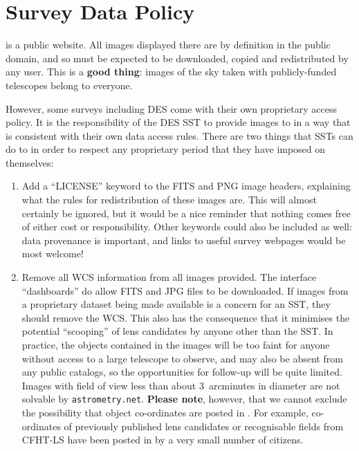\documentclass[a4paper,twocolumn]{article}
\begin{document}


\section{Survey Data Policy}
\label{sec:data}

\SW is a public website. All images displayed there are by definition in the
public domain, and so must be expected to be downloaded, copied and
redistributed by any \SW user. This is a \textbf{good thing}: images of the sky taken
with publicly-funded telescopes belong to everyone. 

However, some surveys including DES come with their own proprietary access policy. It is the responsibility
of the DES SST to provide images to \SW in a way that is consistent
with their own data access rules. There are two things that SSTs can
do to in order to respect any proprietary period that they have imposed on
themselves:
\begin{enumerate}

\item Add a ``LICENSE'' keyword to the FITS and PNG image headers, explaining
what the rules for redistribution of these images are. This will almost
certainly be ignored, but it would be a nice reminder that nothing comes free
of either cost or responsibility. Other keywords could also be included as
well: data provenance is important, and links to useful survey webpages would
be most welcome!

\item Remove all WCS information from all images provided. The \SW interface ``dashboards'' do allow FITS and JPG files to be downloaded. If images from a proprietary dataset being made available is a concern for an SST, they should remove the WCS. This also has the consequence that it minimises the potential ``scooping'' of  lens candidates by anyone other than the SST. 
In practice, the objects contained in the \SW images will be too faint
for anyone without access to a large telescope to observe, and may also be
absent from any public catalogs, so the opportunities for follow-up will be
quite limited. Images
with field of view less than about 3~arcminutes in diameter are not solvable
by \texttt{astrometry.net}. \textbf{Please note}, however, that we cannot exclude the possibility that object co-ordinates are posted in \Talk. For example, co-ordinates of previously published lens candidates or recognisable fields from CFHT-LS have been posted in \Talk by a very small number of citizens.

\end{enumerate}
\end{document}
